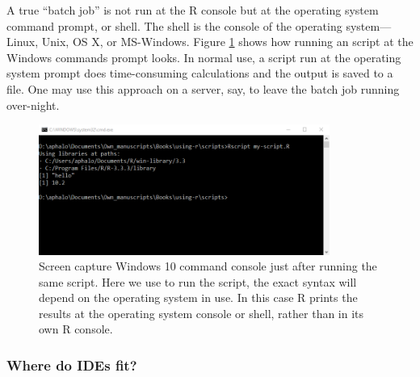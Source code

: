\documentclass[krantz2,ChapterTOCs]{krantz}\usepackage{knitr}
\begin{document}
A true ``batch job'' is not run at the R console but at the operating system command prompt, or shell. The shell is the console of the operating system---Linux, Unix, OS X, or MS-Windows. Figure \ref{fig:intro:shell} shows how running an script at the Windows commands prompt looks. In normal use, a script run at the operating system prompt does time-consuming calculations and the output is saved to a file. One may use this approach on a server, say, to leave the batch job running over-night.

\begin{figure}
  \centering
  \includegraphics[width=0.85\textwidth]{figures/windows-cmd-script}
  \caption[Script at the Windows cmd promt]{Screen capture Windows 10 command console just after running the same script. Here we use  to run the script, the exact syntax will depend on the operating system in use. In this case R prints the results at the operating system console or shell, rather than in its own R console.}\label{fig:intro:shell}
\end{figure}

\subsubsection{Where do IDEs fit?}
\end{document}
